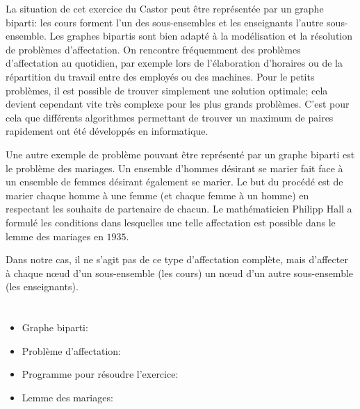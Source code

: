 {{{\centering%
\par}

La situation de cet exercice du Castor peut être représentée par un graphe biparti: les cours forment l’un des sous-ensembles et les enseignants l’autre sous-ensemble. Les graphes bipartis sont bien adapté à la modélisation et la résolution de problèmes d’affectation. On rencontre fréquemment des problèmes d’affectation au quotidien, par exemple lors de l’élaboration d’horaires ou de la répartition du travail entre des employés ou des machines. Pour le petits problèmes, il est possible de trouver simplement une solution optimale; cela devient cependant vite très complexe pour les plus grands problèmes. C’est pour cela que différents algorithmes permettant de trouver un maximum de paires rapidement ont été développés en informatique.

Une autre exemple de problème pouvant être représenté par un graphe biparti est le problème des mariages. Un ensemble d’hommes désirant se marier fait face à un ensemble de femmes désirant également se marier. Le but du procédé est de marier chaque homme à une femme (et chaque femme à un homme) en respectant les souhaits de partenaire de chacun. Le mathématicien Philipp Hall a formulé les conditions dans lesquelles une telle affectation est possible dans le lemme des mariages en $1935$.

Dans notre cas, il ne s’agit pas de ce type d’affectation complète, mais d’affecter à chaque nœud d’un sous-ensemble (les cours) un nœud d’un autre sous-ensemble (les enseignants).



\section*{\BrochureWebsitesAndKeywords}
{\raggedright
\begin{itemize}
  \item Graphe biparti: \href{https://fr.wikipedia.org/wiki/Graphe_biparti}{}
  \item Problème d’affectation: \href{https://fr.wikipedia.org/wiki/Probl\%C3\%A8me_d\%27affectation}{}
  \item Programme pour résoudre l’exercice: \href{https://www.coding4you.at/dachu_2023/ir02/index.html}{}
  \item Lemme des mariages: \href{https://images.math.cnrs.fr/Le-lemme-des-Mariages.html}{}
\end{itemize}


}}}
